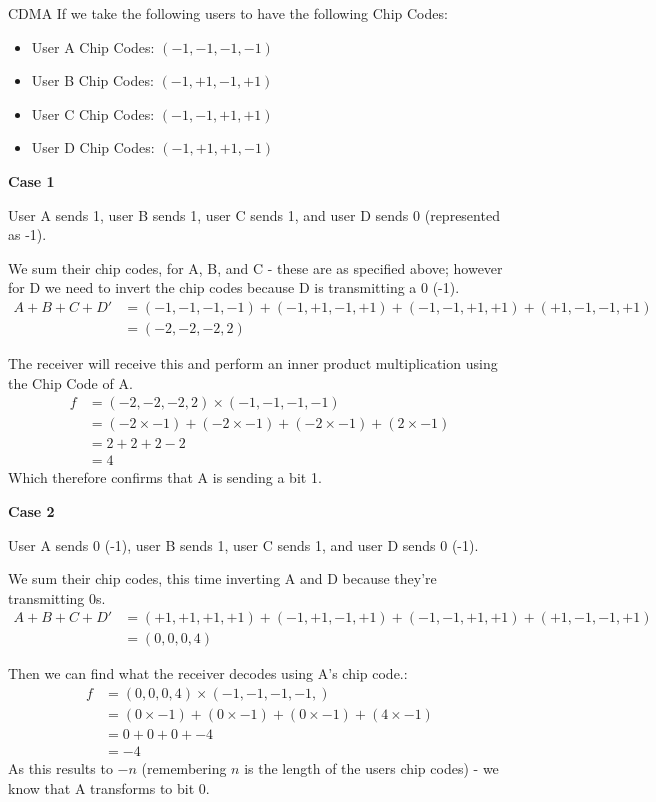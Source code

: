 \begin{example}{CDMA}
If we take the following users to have the following Chip Codes:
\begin{itemize}
    \item User A Chip Codes: $(-1, -1, -1, -1)$
    \item User B Chip Codes: $(-1, +1, -1, +1)$
    \item User C Chip Codes: $(-1, -1, +1, +1)$
    \item User D Chip Codes: $(-1, +1, +1, -1)$
\end{itemize}

\textbf{Case 1}

User A sends 1, user B sends 1, user C sends 1, and user D sends 0 (represented as -1).

We sum their chip codes, for A, B, and C - these are as specified above; however for D we need to invert the chip codes because D is transmitting a 0 (-1).
\begin{align*}
A + B + C + D' &= (-1, -1, -1, -1) + (-1, +1, -1, +1) + (-1, -1, +1, +1)+ (+1, -1, -1, +1)\\
&= (-2, -2, -2, 2)
\end{align*}

The receiver will receive this and perform an inner product multiplication using the Chip Code of A.
\begin{align*}
f &= (-2, -2, -2, 2) \times (-1, -1, -1, -1)\\
&= (-2 \times -1) + (-2 \times -1) + (-2 \times -1) + (2 \times -1)\\
&= 2 + 2 + 2 - 2\\
&= 4
\end{align*}
Which therefore confirms that A is sending a bit 1.

\textbf{Case 2}

User A sends 0 (-1), user B sends 1, user C sends 1, and user D sends 0 (-1). 

We sum their chip codes, this time inverting A and D because they're transmitting 0s.
\begin{align*}
A + B + C + D' &= (+1, +1, +1, +1) + (-1, +1, -1, +1) + (-1, -1, +1, +1)+ (+1, -1, -1, +1)\\
&= (0, 0, 0, 4)
\end{align*}

Then we can find what the receiver decodes using A's chip code.:
\begin{align*}
f &= (0, 0, 0, 4) \times (-1, -1, -1, -1,)\\
&= (0 \times -1) + (0 \times -1) + (0 \times -1) + (4 \times -1)\\
&= 0 + 0 + 0 + -4\\
&= -4
\end{align*}
As this results to $-n$ (remembering $n$ is the length of the users chip codes) - we know that A transforms to bit 0. 
\end{example}